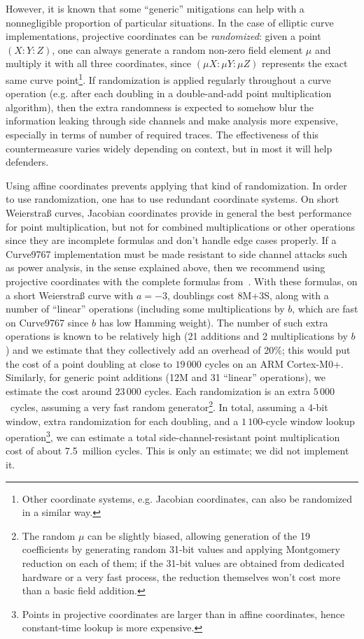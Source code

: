 \documentclass{llncs}
\begin{document}
However, it is known that some ``generic'' mitigations can help with a
nonnegligible proportion of particular situations. In the case of
elliptic curve implementations, projective coordinates can be
\emph{randomized}: given a point $(X{:}Y{:}Z)$, one can always generate
a random non-zero field element $\mu$ and multiply it with all three
coordinates, since $(\mu X{:}\mu Y{:}\mu Z)$ represents the exact same
curve point\footnote{Other coordinate systems, e.g. Jacobian
coordinates, can also be randomized in a similar way.}. If randomization
is applied regularly throughout a curve operation (e.g. after each
doubling in a double-and-add point multiplication algorithm), then the
extra randomness is expected to somehow blur the information leaking
through side channels and make analysis more expensive, especially in
terms of number of required traces. The effectiveness of this
countermeasure varies widely depending on context, but in most it will
help defenders.

Using affine coordinates prevents applying that kind of randomization.
In order to use randomization, one has to use redundant coordinate
systems. On short Weierstraß curves, Jacobian coordinates provide in
general the best performance for point multiplication, but not for
combined multiplications or other operations since they are incomplete
formulas and don't handle edge cases properly. If a Curve9767
implementation must be made resistant to side channel attacks such as
power analysis, in the sense explained above, then we recommend using
projective coordinates with the complete formulas
from~\cite{RenCosBat2015}. With these formulas, on a short Weierstraß
curve with $a = -3$, doublings cost 8M+3S, along with a number of
``linear'' operations (including some multiplications by $b$, which are
fast on Curve9767 since $b$ has low Hamming weight). The number of such
extra operations is known to be relatively high (21 additions and 2
multiplications by $b$) and we estimate that they collectively add an
overhead of 20\%; this would put the cost of a point doubling at close
to $19\,000$ cycles on an ARM Cortex-M0+. Similarly, for generic point
additions (12M and 31 ``linear'' operations), we estimate the cost
around $23\,000$ cycles. Each randomization is an extra $5\,000$~cycles,
assuming a very fast random generator\footnote{The random $\mu$ can be
slightly biased, allowing generation of the 19 coefficients by
generating random 31-bit values and applying Montgomery reduction on
each of them; if the 31-bit values are obtained from dedicated hardware
or a very fast process, the reduction themselves won't cost more than a
basic field addition.}. In total, assuming a 4-bit window, extra
randomization for each doubling, and a $1\,100$-cycle window lookup
operation\footnote{Points in projective coordinates are larger than in
affine coordinates, hence constant-time lookup is more expensive.}, we
can estimate a total side-channel-resistant point multiplication cost of
about 7.5~million cycles. This is only an estimate; we did not implement
it.
\end{document}
